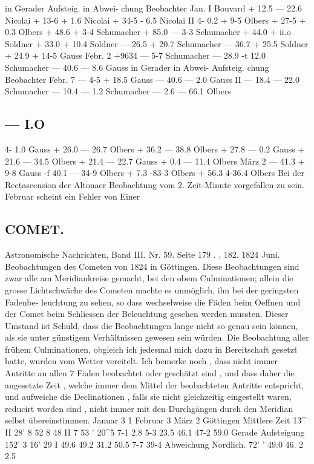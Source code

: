 \documentclass[10pt,a4paper]{article}
\begin{document}
in  Gerader
Aufsteig.
in  Abwei-
chung
Beobachter
Jan.     I
Bouvard
+  12.5
---  22.6
Nicolai
+  13-6
+    1.6
Nicolai
+  34-5
-    6.5
Nicolai
II
4-    0.2
+    9-5
Olbers
+  27-5
+    0.3
Olbers
+  48.6
+    3-4
Schumacher
+  85.0
---    3-3
Schumacher
+  44.0
+  ii.o
Soldner
+  33.0
+  10.4
Soldner
---  26.5
+  20.7
Schumacher
---  36.7
+  25.5
Soldner
+  24.9
+  14-5
Gauss
Febr.   2
+9634
---    5-7
Schumacher
---  28.9
-t  12.0
Schumacher
---  40.6
---    8.6
Gauss
in  Gerader in  Abwei-
Aufsteig.
chung
Beobachter
Febr.   7
---   4-5
+  18.5
Gauss
---  40.6
---    2.0
Gauss
II
---  18.4
---  22.0
Schumacher
---  10.4
---    1.2
Schumacher
---   2.6
---  66.1
Olbers
\subsection*{---     I.O}

4-   1.0
Gauss
+  26.0
---  26.7
Olbers
+  36.2
---  38.8
Olbers
+  27.8
---  0.2
Gauss
+  21.6
---  34.5
Olbers
+  21.4
---  22.7
Gauss
+    0.4
--- 11.4
Olbers
März    2
---  41.3
+    9-8
Gauss
-f  40.1
---  34-9
Olbers
+    7.3
-83-3
Olbers
+  56.3
4-36.4
Olbers
Bei  der  Rectascension    der  Altonaer  Beobachtung    vom   2.
Zeit-Minute  vorgefallen  zu  sein.
Februar   scheint  ein  Fehler  von  Einer
\subsection*{COMET.}

Astronomische  Nachrichten,     Band  III.  Nr.  59.  Seite  179  . .  182.     1824  Juni.
Beobachtungen  des  Cometen  von  1824  in  Göttingen.
Diese  Beobachtungen  sind  zwar  alle  am  Meridiankreise  gemacht,  bei  den  obem  Culminationen;
allein  die  grosse  Lichtschwäche  des  Cometen  machte  es  unmöglich,  ihn  bei  der  geringsten  Fadenbe-
leuchtung zu  sehen,  so  dass  wechselweise  die  Fäden  beim  Oeffnen  und  der  Comet  beim  Schliessen  der
Beleuchtung  gesehen  werden  mussten.  Dieser  Umstand  ist  Schuld,  dass  die  Beobachtungen  lange  nicht
so  genau  sein  können,  als  sie  unter  günstigem  Verhältnissen  gewesen  sein  würden.  Die  Beobachtung
aller  frühem  Culminationen,  obgleich  ich  jedesmal  mich  dazu  in  Bereitschaft  gesetzt  hatte,  wurden
vom  Wetter  vereitelt.  Ich  bemerke  noch ,  dass  nicht  immer  Antritte  an  allen  7  Fäden  beobachtet  oder
geschätzt  sind ,  und  dass  daher  die  angesetzte  Zeit ,  welche  immer  dem  Mittel  der  beobachteten  Antritte
entspricht,  und  aufweiche  die  Declinationen ,  falls  sie  nicht  gleichzeitig  eingestellt  waren,  reducirt
worden  sind ,  nicht  immer  mit  den  Durchgängen  durch  den  Meridian  selbst  übereinstimmen.
Januar     3 1
Februar    3
März  2
Göttingen
Mittlere  Zeit
13\textasciicircum{}
II
28'
8  52
8  48
II
7     53
'  20\textasciicircum{}5
7-1
2.8
5-3
23.5
46.1
47-2
59.0
Gerade
Aufsteigung
152'
\glqq{}3
16'
29  I
49.6
49.2
31.2
50.5
7-7
39-4
Abweichung
Nordlich.
72'
'
49.0
46.  2
2.5
\end{document}
